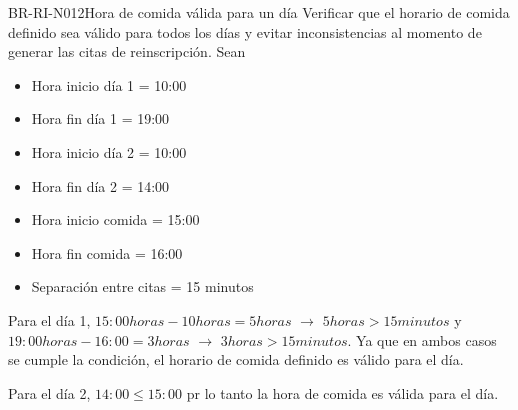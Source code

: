 \begin{BusinessRule}{BR-RI-N012}{Hora de comida válida para un día}
	\BRItem[Motivación:] Verificar que el horario de comida definido sea válido para todos los días  y evitar inconsistencias al momento de generar las citas de reinscripción.
	\BRItem[Ejemplo:]
	Sean 
	\begin{itemize}
		\item Hora inicio día 1 = 10:00
		\item Hora fin día 1 = 19:00
		\item Hora inicio día 2 = 10:00
		\item Hora fin día 2 = 14:00
		\item Hora inicio comida = 15:00
		\item Hora fin comida = 16:00
		\item Separación entre citas = 15 minutos
	\end{itemize}
	Para el día 1, $15:00 horas - 10 horas = 5 horas$  $\rightarrow$ $5 horas > 15 minutos$ y $19:00 horas - 16:00 = 3 horas$ $\rightarrow$ $3 horas > 15 minutos$. Ya que en ambos casos se cumple la condición, el horario de comida definido es válido para el día.
	
	Para el día 2, $14:00 \leq 15:00$ pr lo tanto la hora de comida es válida para el día.
\end{BusinessRule}

